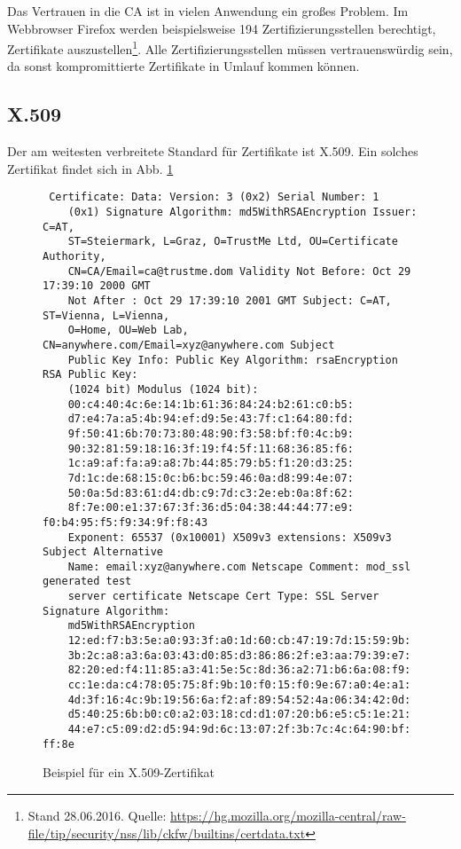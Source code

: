 Das Vertrauen in die CA ist in vielen Anwendung ein großes Problem. Im
Webbrowser Firefox werden beispielsweise 194 Zertifizierungsstellen
berechtigt, Zertifikate auszustellen\footnote{Stand 28.06.2016. Quelle:
  \url{https://hg.mozilla.org/mozilla-central/raw-file/tip/security/nss/lib/ckfw/builtins/certdata.txt}}. Alle
Zertifizierungsstellen müssen vertrauenswürdig sein, da sonst
kompromittierte Zertifikate in Umlauf kommen können.

\subsection{X.509}\indexXFiveZeroNine Der am weitesten verbreitete
Standard für Zertifikate ist X.509. Ein solches Zertifikat findet sich
in Abb. \ref{fig:x509}
\begin{figure}
  \begin{lstlisting} Certificate: Data: Version: 3 (0x2) Serial Number: 1
    (0x1) Signature Algorithm: md5WithRSAEncryption Issuer: C=AT,
    ST=Steiermark, L=Graz, O=TrustMe Ltd, OU=Certificate Authority,
    CN=CA/Email=ca@trustme.dom Validity Not Before: Oct 29 17:39:10 2000 GMT
    Not After : Oct 29 17:39:10 2001 GMT Subject: C=AT, ST=Vienna, L=Vienna,
    O=Home, OU=Web Lab, CN=anywhere.com/Email=xyz@anywhere.com Subject
    Public Key Info: Public Key Algorithm: rsaEncryption RSA Public Key:
    (1024 bit) Modulus (1024 bit):
    00:c4:40:4c:6e:14:1b:61:36:84:24:b2:61:c0:b5:
    d7:e4:7a:a5:4b:94:ef:d9:5e:43:7f:c1:64:80:fd:
    9f:50:41:6b:70:73:80:48:90:f3:58:bf:f0:4c:b9:
    90:32:81:59:18:16:3f:19:f4:5f:11:68:36:85:f6:
    1c:a9:af:fa:a9:a8:7b:44:85:79:b5:f1:20:d3:25:
    7d:1c:de:68:15:0c:b6:bc:59:46:0a:d8:99:4e:07:
    50:0a:5d:83:61:d4:db:c9:7d:c3:2e:eb:0a:8f:62:
    8f:7e:00:e1:37:67:3f:36:d5:04:38:44:44:77:e9: f0:b4:95:f5:f9:34:9f:f8:43
    Exponent: 65537 (0x10001) X509v3 extensions: X509v3 Subject Alternative
    Name: email:xyz@anywhere.com Netscape Comment: mod_ssl generated test
    server certificate Netscape Cert Type: SSL Server Signature Algorithm:
    md5WithRSAEncryption
    12:ed:f7:b3:5e:a0:93:3f:a0:1d:60:cb:47:19:7d:15:59:9b:
    3b:2c:a8:a3:6a:03:43:d0:85:d3:86:86:2f:e3:aa:79:39:e7:
    82:20:ed:f4:11:85:a3:41:5e:5c:8d:36:a2:71:b6:6a:08:f9:
    cc:1e:da:c4:78:05:75:8f:9b:10:f0:15:f0:9e:67:a0:4e:a1:
    4d:3f:16:4c:9b:19:56:6a:f2:af:89:54:52:4a:06:34:42:0d:
    d5:40:25:6b:b0:c0:a2:03:18:cd:d1:07:20:b6:e5:c5:1e:21:
    44:e7:c5:09:d2:d5:94:9d:6c:13:07:2f:3b:7c:4c:64:90:bf: ff:8e
  \end{lstlisting}
  \caption{Beispiel für ein X.509-Zertifikat}
  \label{fig:x509}
\end{figure}

